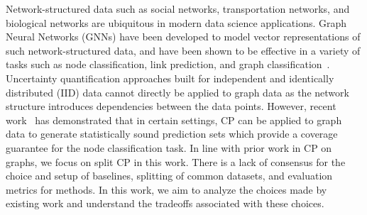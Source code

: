 Network-structured data such as social networks, transportation networks, and biological networks are ubiquitous in modern data science applications.
Graph Neural Networks (GNNs) have been developed to model vector representations of such network-structured data, and have been shown to be effective in a variety of tasks such as node classification, link prediction, and graph classification~\citep{hamilton2020graph, wu2022graph}.
Uncertainty quantification approaches built for independent and identically distributed (IID) data cannot directly be applied to graph data as the network structure introduces dependencies between the data points.
However, recent work~\citep{clarkson2023distribution,zargarbashi23conformal,huang2024uncertainty} has demonstrated that in certain settings, CP can be applied to graph data to generate statistically sound prediction sets which provide a coverage guarantee for the node classification task.
In line with prior work in CP on graphs, we focus on split CP in this work.
There is a lack of consensus for the choice and setup of baselines, splitting of common datasets, and evaluation metrics for methods.
In this work, we aim to analyze the choices made by existing work and understand the tradeoffs associated with these choices.
